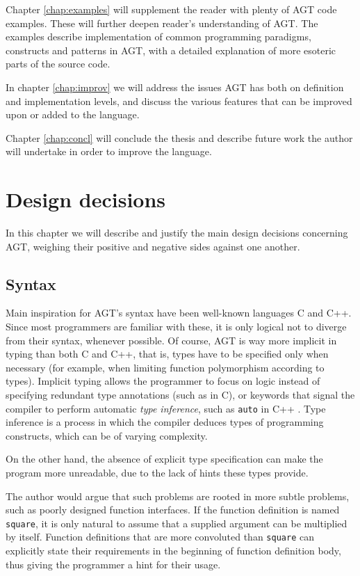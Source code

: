 \documentclass[times, utf8, diplomski]{fer}
\theoremstyle{definition}
\begin{document}
Chapter \ref{chap:examples} will supplement the reader with plenty of AGT code examples. These will
further deepen reader's understanding of AGT. The examples describe implementation
of common programming paradigms, constructs and patterns in AGT, with a detailed
explanation of more esoteric parts of the source code.

In chapter \ref{chap:improv} we will address the issues AGT has both on
definition and implementation levels, and discuss the various features that can
be improved upon or added to the language.

Chapter \ref{chap:concl} will conclude the thesis and describe future work the
author will undertake in order to improve the language.

\chapter{Design decisions}\label{chap:design}

In this chapter we will describe and justify the main design decisions concerning AGT,
weighing their positive and negative sides against one another.

\section{Syntax}

Main inspiration for AGT's syntax have been well-known languages C and C++.
Since most programmers are familiar with these, it is only logical not to diverge from their syntax,
whenever possible.
Of course, AGT is way more implicit in typing than both C and C++, that is, types have to be specified
only when necessary (for example, when limiting function polymorphism according to types).
Implicit typing allows the programmer to focus on logic instead of specifying redundant type annotations
(such as in C), or keywords that signal the compiler to perform automatic \textit{type
inference}, such as \texttt{auto} in C++ \citep{c_auto}. Type inference is a process
in which the compiler deduces types of programming constructs, which can be of varying complexity.

On the other hand, the absence of explicit type specification can make the program more unreadable,
due to the lack of hints these types provide. 

The author would argue that such problems are
rooted in more subtle problems, such as poorly designed function interfaces.
If the function definition is named \texttt{square}, 
it is only natural to assume that a supplied argument can be multiplied by itself.
Function definitions that are more convoluted than \texttt{square} can explicitly state their requirements
in the beginning of function definition body, thus giving the programmer a hint for their usage. 
\end{document}
